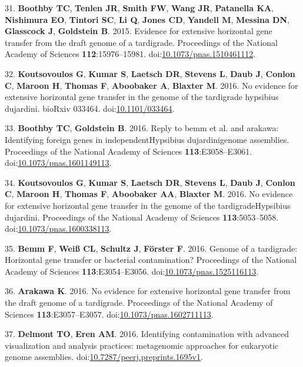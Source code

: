 \documentclass[11,]{article}
\begin{document}
31. \textbf{Boothby TC}, \textbf{Tenlen JR}, \textbf{Smith FW},
\textbf{Wang JR}, \textbf{Patanella KA}, \textbf{Nishimura EO},
\textbf{Tintori SC}, \textbf{Li Q}, \textbf{Jones CD}, \textbf{Yandell
M}, \textbf{Messina DN}, \textbf{Glasscock J}, \textbf{Goldstein B}.
2015. Evidence for extensive horizontal gene transfer from the draft
genome of a tardigrade. Proceedings of the National Academy of Sciences
\textbf{112}:15976--15981.
doi:\href{http://dx.doi.org/10.1073/pnas.1510461112}{10.1073/pnas.1510461112}.

32. \textbf{Koutsovoulos G}, \textbf{Kumar S}, \textbf{Laetsch DR},
\textbf{Stevens L}, \textbf{Daub J}, \textbf{Conlon C}, \textbf{Maroon
H}, \textbf{Thomas F}, \textbf{Aboobaker A}, \textbf{Blaxter M}. 2016.
No evidence for extensive horizontal gene transfer in the genome of the
tardigrade hypsibius dujardini. bioRxiv 033464.
doi:\href{http://dx.doi.org/10.1101/033464}{10.1101/033464}.

33. \textbf{Boothby TC}, \textbf{Goldstein B}. 2016. Reply to bemm et
al. and arakawa: Identifying foreign genes in independentHypsibius
dujardinigenome assemblies. Proceedings of the National Academy of
Sciences \textbf{113}:E3058--E3061.
doi:\href{http://dx.doi.org/10.1073/pnas.1601149113}{10.1073/pnas.1601149113}.

34. \textbf{Koutsovoulos G}, \textbf{Kumar S}, \textbf{Laetsch DR},
\textbf{Stevens L}, \textbf{Daub J}, \textbf{Conlon C}, \textbf{Maroon
H}, \textbf{Thomas F}, \textbf{Aboobaker AA}, \textbf{Blaxter M}. 2016.
No evidence for extensive horizontal gene transfer in the genome of the
tardigradeHypsibius dujardini. Proceedings of the National Academy of
Sciences \textbf{113}:5053--5058.
doi:\href{http://dx.doi.org/10.1073/pnas.1600338113}{10.1073/pnas.1600338113}.

35. \textbf{Bemm F}, \textbf{Wei{ß} CL}, \textbf{Schultz J},
\textbf{Förster F}. 2016. Genome of a tardigrade: Horizontal gene
transfer or bacterial contamination? Proceedings of the National Academy
of Sciences \textbf{113}:E3054--E3056.
doi:\href{http://dx.doi.org/10.1073/pnas.1525116113}{10.1073/pnas.1525116113}.

36. \textbf{Arakawa K}. 2016. No evidence for extensive horizontal gene
transfer from the draft genome of a tardigrade. Proceedings of the
National Academy of Sciences \textbf{113}:E3057--E3057.
doi:\href{http://dx.doi.org/10.1073/pnas.1602711113}{10.1073/pnas.1602711113}.

37. \textbf{Delmont TO}, \textbf{Eren AM}. 2016. Identifying
contamination with advanced visualization and analysis practices:
metagenomic approaches for eukaryotic genome assemblies.
doi:\href{http://dx.doi.org/10.7287/peerj.preprints.1695v1}{10.7287/peerj.preprints.1695v1}.
\end{document}
